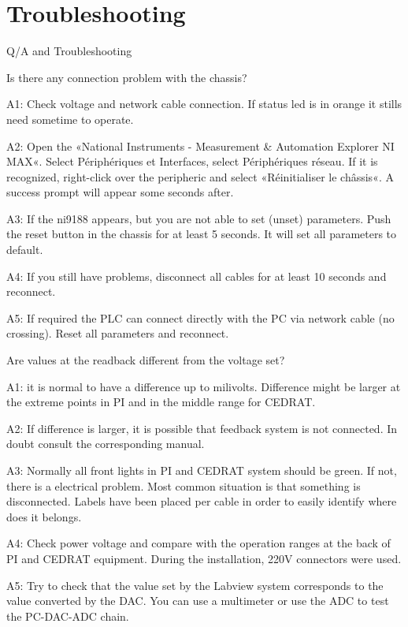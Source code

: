 \section{Troubleshooting}
Q/A and Troubleshooting\par 
Is there any connection problem with the chassis?\par 
A1: Check voltage and network cable connection. If status led is in orange it stills need sometime to operate.\par 
A2: Open the «National Instruments - Measurement \& Automation Explorer NI MAX«. Select Périphériques et Interfaces, select Périphériques réseau. If it is recognized, right-click over the peripheric and select «Réinitialiser le châssis«. A success prompt will appear some seconds after.\par 
A3: If the ni9188 appears, but you are not able to set (unset) parameters. Push the reset button in the chassis for at least 5 seconds. It will set all parameters to default.\par 
A4: If you still have problems, disconnect all cables for at least 10 seconds and reconnect.\par 
A5: If required the PLC can connect directly with the PC via network cable (no crossing). Reset all parameters and reconnect.\par 

Are values at the readback different from the voltage set?\par 
A1: it is normal to have a difference up to milivolts. Difference might be larger at the extreme points in PI and in the middle range for CEDRAT.\par 
A2: If difference is larger, it is possible that feedback system is not connected. In doubt  consult the corresponding manual.\par 
A3: Normally all front lights in PI and CEDRAT system should be green. If not, there is a electrical problem. Most common situation is that something is disconnected. Labels have been placed per cable in order to easily identify where does it belongs.\par 
A4: Check power voltage and compare with the operation ranges at the back of PI and CEDRAT equipment. During the installation, 220V connectors were used.\par 
A5: Try to check that the value set by the Labview system corresponds to the value converted by the DAC. You can use a multimeter or use the ADC to test the PC-DAC-ADC chain.\par 

